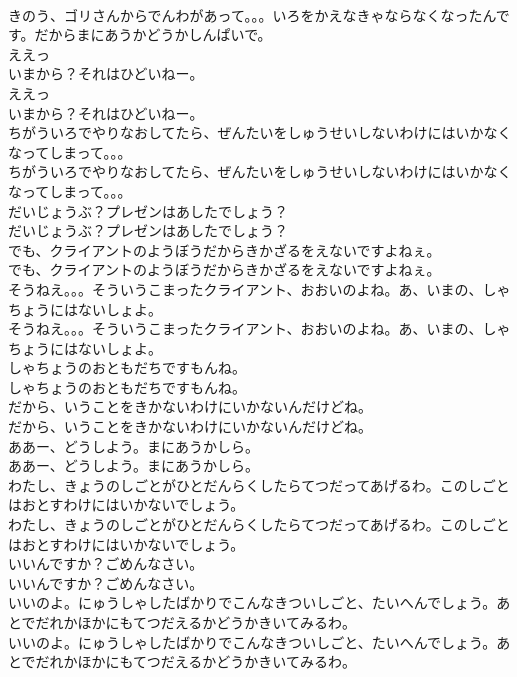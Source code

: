 \documentclass[8pt]{extreport}
\begin{document}
\begin{CJK}{UTF8}{min}
\\	きのう、ゴリさんからでんわがあって。。。いろをかえなきゃならなくなったんです。だからまにあうかどうかしんぱいで。
\\	ええっ
\\	いまから？それはひどいねー。
\\	ええっ
\\	いまから？それはひどいねー。
\\	ちがういろでやりなおしてたら、ぜんたいをしゅうせいしないわけにはいかなくなってしまって。。。
\\	ちがういろでやりなおしてたら、ぜんたいをしゅうせいしないわけにはいかなくなってしまって。。。
\\	だいじょうぶ？プレゼンはあしたでしょう？
\\	だいじょうぶ？プレゼンはあしたでしょう？
\\	でも、クライアントのようぼうだからきかざるをえないですよねぇ。
\\	でも、クライアントのようぼうだからきかざるをえないですよねぇ。
\\	そうねえ。。。そういうこまったクライアント、おおいのよね。あ、いまの、しゃちょうにはないしょよ。
\\	そうねえ。。。そういうこまったクライアント、おおいのよね。あ、いまの、しゃちょうにはないしょよ。
\\	しゃちょうのおともだちですもんね。
\\	しゃちょうのおともだちですもんね。
\\	だから、いうことをきかないわけにいかないんだけどね。
\\	だから、いうことをきかないわけにいかないんだけどね。
\\	ああー、どうしよう。まにあうかしら。
\\	ああー、どうしよう。まにあうかしら。
\\	わたし、きょうのしごとがひとだんらくしたらてつだってあげるわ。このしごとはおとすわけにはいかないでしょう。
\\	わたし、きょうのしごとがひとだんらくしたらてつだってあげるわ。このしごとはおとすわけにはいかないでしょう。
\\	いいんですか？ごめんなさい。
\\	いいんですか？ごめんなさい。
\\	いいのよ。にゅうしゃしたばかりでこんなきついしごと、たいへんでしょう。あとでだれかほかにもてつだえるかどうかきいてみるわ。
\\	いいのよ。にゅうしゃしたばかりでこんなきついしごと、たいへんでしょう。あとでだれかほかにもてつだえるかどうかきいてみるわ。

\end{CJK}
\end{document}

